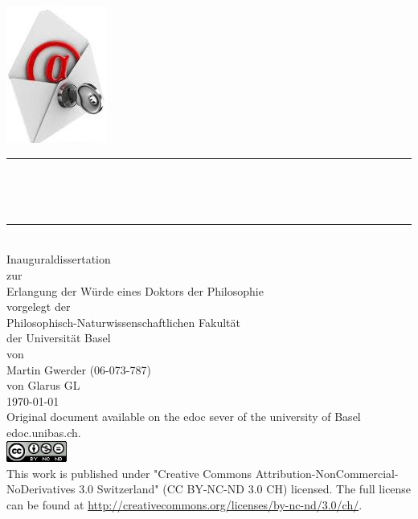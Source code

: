 \begin{titlepage}
\pagecolor{gray}\afterpage{\nopagecolor}
\begin{center}
\includegraphics[height=0.4\paperwidth]{./inc/logo.jpg}~\\[1cm]

\newcommand{\HRule}{\rule{\linewidth}{0.5mm}}
\HRule \\[0.4cm]
{ \huge \bfseries \makeatletter\@title\par\normalsize\@subtitle\makeatother \\[0.4cm] }

\HRule \\[4.5cm]

{\large Inauguraldissertation}\\
zur\\
Erlangung der W\"urde eines Doktors der Philosophie\\
vorgelegt der\\
Philosophisch-Naturwissenschaftlichen Fakult\"at\\
der Universit\"at Basel\\
von\\
Martin Gwerder (06-073-787)\\
von Glarus GL\\

\vfill
{\large \today\\[1cm]}
{\footnotesize Original document available on the edoc sever of the university of Basel edoc.unibas.ch.\\[0.5cm]
\includegraphics[height=7mm]{./inc/cclic.png}~\\[0.5cm]
This work is published under  "Creative Commons Attribution-NonCommercial-NoDerivatives 3.0 Switzerland" (CC BY-NC-ND 3.0 CH) licensed. The full license can be found at \url{http://creativecommons.org/licenses/by-nc-nd/3.0/ch/}.
}
\end{center}
\end{titlepage}\restoregeometry\onecolumn\clearpage\pagestyle{plain}

